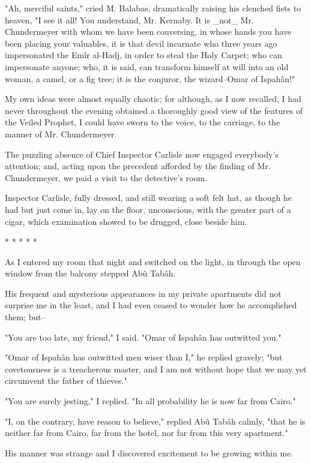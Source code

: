 "Ah, merciful saints," cried M. Balabas, dramatically raising his
clenched fists to heaven, "I see it all! You understand, Mr. Kernaby.
It is _not_ Mr. Chundermeyer with whom we have been conversing, in
whose hands you have been placing your valuables, it is that devil
incarnate who three years ago impersonated the Emîr al-Hadj, in order
to steal the Holy Carpet; who can impersonate anyone; who, it is said,
can transform himself at will into an old woman, a camel, or a fig
tree; it is the conjuror, the wizard--Omar of Ispahân!"

My own ideas were almost equally chaotic; for although, as I now
recalled, I had never throughout the evening obtained a thoroughly
good view of the features of the Veiled Prophet, I could have sworn
to the voice, to the carriage, to the manner of Mr. Chundermeyer.

The puzzling absence of Chief Inspector Carlisle now engaged
everybody's attention; and, acting upon the precedent afforded by the
finding of Mr. Chundermeyer, we paid a visit to the detective's room.

Inspector Carlisle, fully dressed, and still wearing a soft felt hat,
as though he had but just come in, lay on the floor, unconscious, with
the greater part of a cigar, which examination showed to be drugged,
close beside him.

       *       *       *       *       *

As I entered my room that night and switched on the light, in through
the open window from the balcony stepped Abû Tabâh.

His frequent and mysterious appearances in my private apartments did
not surprise me in the least, and I had even ceased to wonder how he
accomplished them; but--

"You are too late, my friend," I said. "Omar of Ispahân has outwitted
you."

"Omar of Ispahân has outwitted men wiser than I," he replied gravely;
"but covetousness is a treacherous master, and I am not without hope
that we may yet circumvent the father of thieves."

"You are surely jesting," I replied. "In all probability he is now far
from Cairo."

"I, on the contrary, have reason to believe," replied Abû Tabâh
calmly, "that he is neither far from Cairo, far from the hotel,
nor far from this very apartment."

His manner was strange and I discovered excitement to be growing
within me.

